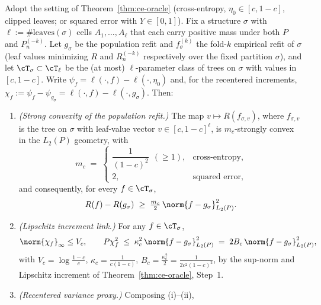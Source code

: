 \begin{lemma}\label{lem:local-curvature}
Adopt the setting of Theorem~\ref{thm:ce-oracle} (cross-entropy,
$\eta_0\in[c,1-c]$, clipped leaves; or squared error with $Y\in[0,1]$). Fix a
structure $\sigma$ with $\ell:=\#\mathrm{leaves}(\sigma)$ cells $A_1,\dots,A_\ell$
that each carry positive mass under both $P$ and $P_n^{(-k)}$. Let $g_\sigma$ be
the population refit and $f_\sigma^{(k)}$ the fold-$k$ empirical refit of $\sigma$
(leaf values minimizing $R$ and $R_n^{(-k)}$ respectively over the fixed
partition $\sigma$), and let $\cT_\sigma\subset\cT_\ell$ be the (at most)
$\ell$-parameter class of trees on $\sigma$ with values in $[c,1-c]$. Write
$\psi_f=\ell(\cdot,f)-\ell(\cdot,\eta_0)$ and, for the recentered increments,
$\chi_f:=\psi_f-\psi_{g_\sigma}=\ell(\cdot,f)-\ell(\cdot,g_\sigma)$. Then:
\begin{enumerate}
\item[(i)] \emph{(Strong convexity of the population refit.)} The map
  $v\mapsto R(f_{\sigma,v})$, where $f_{\sigma,v}$ is the tree on $\sigma$ with
  leaf-value vector $v\in[c,1-c]^{\ell}$, is $m_c$-strongly convex in the
  $L_2(P)$ geometry, with
  \begin{equation}\label{eq:curv-const}
    m_c \;=\;
    \begin{cases}
      \dfrac{1}{(1-c)^{2}}\ \ (\ge 1), & \text{cross-entropy},\\[4pt]
      2, & \text{squared error},
    \end{cases}
  \end{equation}
  and consequently, for every $f\in\cT_\sigma$,
  \begin{equation}\label{eq:sc-lower}
    R(f) - R(g_\sigma)\;\ge\;\tfrac{m_c}{2}\,\norm{f-g_\sigma}_{L_2(P)}^2 .
  \end{equation}
\item[(ii)] \emph{(Lipschitz increment link.)} For any $f\in\cT_\sigma$,
  \begin{equation}\label{eq:var-link}
    \norm{\chi_f}_\infty\le V_c,\qquad
    P\chi_f^2\;\le\; \kappa_c^2\,\norm{f-g_\sigma}_{L_2(P)}^2
      \;=\; 2B_c\,\norm{f-g_\sigma}_{L_2(P)}^2,
  \end{equation}
  with $V_c=\log\tfrac{1-c}{c}$, $\kappa_c=\tfrac{1}{c(1-c)}$,
  $B_c=\tfrac{\kappa_c^2}{2}=\tfrac{1}{2c^2(1-c)^2}$, by the sup-norm and
  Lipschitz increment of Theorem~\ref{thm:ce-oracle}, Step~1.
\item[(iii)] \emph{(Recentered variance proxy.)} Composing (i)--(ii),

\end{enumerate}
\end{lemma}
